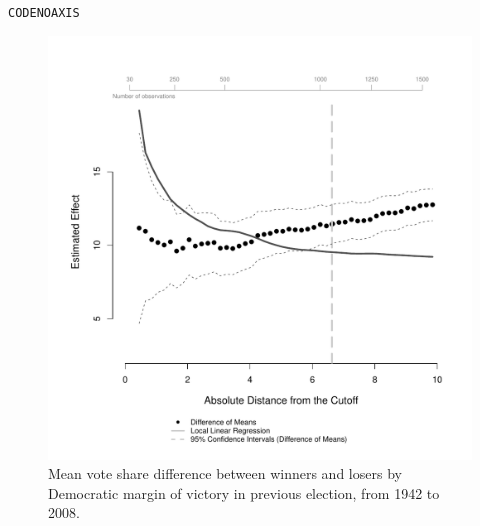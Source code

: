 \documentclass[letterpaper,twoside,12pt]{article}\usepackage[]{graphicx}\usepackage[]{color}
\makeatletter
\newenvironment{kframe}{%
 \def\at@end@of@kframe{}%
 \ifinner\ifhmode%
  \def\at@end@of@kframe{\end{minipage}}%
  \begin{minipage}{\columnwidth}%
 \fi\fi%
 \def\FrameCommand##1{\hskip\@totalleftmargin \hskip-\fboxsep
 \colorbox{shadecolor}{##1}\hskip-\fboxsep
     \hskip-\linewidth \hskip-\@totalleftmargin \hskip\columnwidth}%
 \MakeFramed {\advance\hsize-\width
   \@totalleftmargin\z@ \linewidth\hsize
   \@setminipage}}%
 {\par\unskip\endMakeFramed%
 \at@end@of@kframe}
\newenvironment{knitrout}{}{} %
\makeatother
\begin{document}
\begin{knitrout}
\color{fgcolor}\begin{kframe}
\begin{alltt}
CODE NO AXIS
\end{alltt}
\end{kframe}
\end{knitrout}




\clearpage
\begin{figure}
  \caption{Mean vote share difference between winners and losers by Democratic margin of victory in previous election, from 1942 to 2008.}\label{fig:main_est_add}
\vspace{-1mm}
  \centerline{\includegraphics[width=1\textwidth]{with_add_est_plot.pdf}}
  \end{figure}
\clearpage
\end{document}
